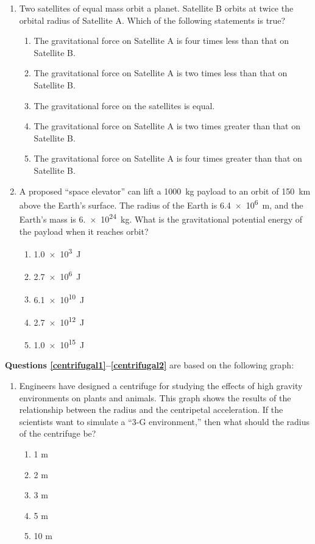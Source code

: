 \documentclass{../../../oss-apphys}
\begin{document}
\begin{multicols}{2}
\begin{enumerate}[leftmargin=18pt]
  \item Two satellites of equal mass orbit a planet. Satellite B orbits at twice
    the orbital radius of Satellite A. Which of the following statements is
    true?
    \begin{enumerate}[nosep,leftmargin=18pt,label=(\Alph*)]
    \item The gravitational force on Satellite A is four times less than that on
      Satellite B.
    \item The gravitational force on Satellite A is two times less than that on
      Satellite B.
    \item The gravitational force on the satellites is equal.
    \item The gravitational force on Satellite A is two times greater than that
      on Satellite B.
    \item The gravitational force on Satellite A is four times greater than that
      on Satellite B.
    \end{enumerate}
    \vspace{.8in}

  \item A proposed ``space elevator'' can lift a \SI{1000}{\kilo\gram} payload
    to an orbit of \SI{150}{\kilo\metre} above the Earth's surface. The radius
    of the Earth is \SI{6.4e6}{\metre}, and the Earth's mass is
    \SI{6.e24}{\kilo\gram}. What is the gravitational potential energy of the
    payload when it reaches orbit?
    \begin{enumerate}[nosep,leftmargin=18pt,label=(\Alph*)]
    \item\SI{1.0e3}{\joule}
    \item\SI{2.7e6}{\joule}
    \item\SI{6.1e10}{\joule}
    \item\SI{2.7e12}{\joule}
    \item\SI{1.0e15}{\joule}
    \end{enumerate}
  \end{enumerate}
  \columnbreak
  
  \textbf{Questions \ref{centrifugal1}--\ref{centrifugal2}} are based on the
  following graph:

  \begin{enumerate}[leftmargin=18pt,resume]
  \item Engineers have designed a centrifuge for studying the effects of high
    gravity environments on plants and animals. This graph shows the
    results of the relationship between the radius and the centripetal
    acceleration. If the scientists want to simulate a “3-G environment,”
    then what should the radius of the centrifuge be?
    \label{centrifugal1}
    \begin{enumerate}[nosep,leftmargin=18pt,label=(\Alph*)]
    \item 1 m
    \item 2 m
    \item 3 m
    \item 5 m
    \item 10 m
    \end{enumerate}
    

\end{enumerate}
\end{multicols}
\end{document}
